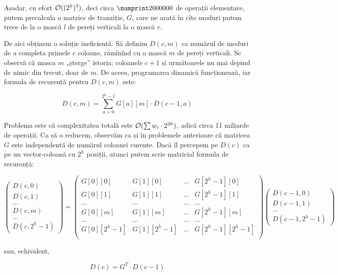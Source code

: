 \documentclass[../main.tex]{subfiles}
\begin{document}
Așadar, cu efort $\mathcal{O}((2^h)^3)$, deci circa $\np{2000000}$ de operații elementare, putem precalcula o matrice de tranziție, $G$, care ne arată în cîte moduri putem trece de la o mască $l$ de pereți verticali la o mască $r$.

De aici obținem o soluție ineficientă. Să definim $D(c, m)$ ca numărul de moduri de a completa primele $c$ coloane, rămînînd cu o mască $m$ de pereți verticali. Se observă că masca $m$ „șterge” istoria: coloanele $c + 1$ și următoarele nu mai depind de nimic din trecut, doar de $m$. De aceea, programarea dinamică funcționează, iar formula de recurență pentru $D(c,m)$ este:

$$D(c,m) = \sum_{a=0}^{2^h - 1} G[a][m] \cdot D(c - 1, a)$$

Problema este că complexitatea totală este $\mathcal{O}(\sum w_i \cdot 2^{2h})$, adică circa 11 miliarde de operații. Ca să o reducem, observăm ca și în problemele anterioare că matricea $G$ este independentă de numărul coloanei curente. Dacă îl percepem pe $D(c)$ ca pe un vector-coloană cu $2^h$ poziții, atunci putem scrie matricial formula de recurență:

$$
\begin{pmatrix}
  D(c,0) \\ D(c,1) \\ \dots \\ D(c,m) \\ \dots \\ D(c,2^h - 1)
\end{pmatrix}
=
\begin{pmatrix}
  G[0][0] & G[1][0] & \dots & G[2^h-1][0] \\
  G[0][1] & G[1][1] & \dots & G[2^h-1][1] \\
  \dots & \dots & \dots & \dots \\
  G[0][m] & G[1][m] & \dots & G[2^h-1][m] \\
  \dots & \dots & \dots & \dots \\
  G[0][2^h-1] & G[1][2^h-1] & \dots & G[2^h-1][2^h-1] \\
\end{pmatrix}
\begin{pmatrix}
  D(c-1,0) \\ D(c-1,1) \\ \dots \\ D(c-1,2^h - 1)
\end{pmatrix}
$$

sau, echivalent,

$$D(c) = G^T \cdot D(c-1)$$
\end{document}
